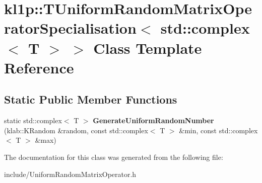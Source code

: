 \hypertarget{classkl1p_1_1TUniformRandomMatrixOperatorSpecialisation_3_01std_1_1complex_3_01T_01_4_01_4}{}\section{kl1p\+:\+:T\+Uniform\+Random\+Matrix\+Operator\+Specialisation$<$ std\+:\+:complex$<$ T $>$ $>$ Class Template Reference}
\label{classkl1p_1_1TUniformRandomMatrixOperatorSpecialisation_3_01std_1_1complex_3_01T_01_4_01_4}
\subsection*{Static Public Member Functions}
\begin{DoxyCompactItemize}
\item 
static std\+::complex$<$ T $>$ {\bfseries Generate\+Uniform\+Random\+Number} (klab\+::\+K\+Random \&random, const std\+::complex$<$ T $>$ \&min, const std\+::complex$<$ T $>$ \&max)\hypertarget{classkl1p_1_1TUniformRandomMatrixOperatorSpecialisation_3_01std_1_1complex_3_01T_01_4_01_4_a86cc24c95017437915156da9beaeda83}{}\label{classkl1p_1_1TUniformRandomMatrixOperatorSpecialisation_3_01std_1_1complex_3_01T_01_4_01_4_a86cc24c95017437915156da9beaeda83}

\end{DoxyCompactItemize}


The documentation for this class was generated from the following file\+:\begin{DoxyCompactItemize}
\item 
include/Uniform\+Random\+Matrix\+Operator.\+h\end{DoxyCompactItemize}
